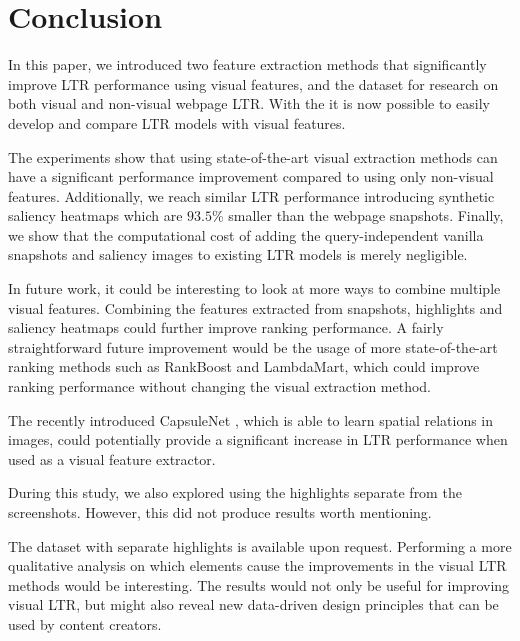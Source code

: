 
\section{Conclusion}
In this paper, we introduced two feature extraction methods that significantly improve \ac{LTR} performance using visual features, and the \datasetname{} dataset for research on both visual and non-visual webpage \ac{LTR}.
With the \datasetname{} it is now possible to easily develop and compare \ac{LTR} models with visual features. 

The experiments show that using state-of-the-art visual extraction methods can have a significant performance improvement compared to using only non-visual features. Additionally, we reach similar \ac{LTR} performance introducing synthetic saliency heatmaps which are $93.5\%$ smaller than the webpage snapshots. Finally, we show that the computational cost of adding the query-independent vanilla snapshots and saliency images to existing \ac{LTR} models is merely negligible.





In future work, it could be interesting to look at more ways to combine multiple visual features. Combining the features extracted from snapshots, highlights and saliency heatmaps could further improve ranking performance. 
A fairly straightforward future improvement would be the usage of more state-of-the-art ranking methods such as RankBoost and LambdaMart, which could improve ranking performance without changing the visual extraction method.

The recently introduced CapsuleNet \cite{sabour2017dynamic}, which is able to learn spatial relations in images, could potentially provide a significant increase in \ac{LTR} performance when used as a visual feature extractor.  

During this study, we also explored using the highlights separate from the screenshots. 
However, this did not produce results worth mentioning. 
\fi

The dataset with separate highlights is available upon request. 
Performing a more qualitative analysis on which elements cause the improvements in the visual \ac{LTR} methods would be interesting. 
The results would not only be useful for improving visual \ac{LTR}, but might also reveal new data-driven design principles that can be used by content creators. 